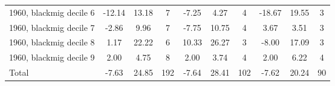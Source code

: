 \begin{table}[htbp]
\begin{tabular}{l*{3}{ccc}}
1960, blackmig decile 6&      -12.14&       13.18&           7&       -7.25&        4.27&           4&      -18.67&       19.55&           3\\
1960, blackmig decile 7&       -2.86&        9.96&           7&       -7.75&       10.75&           4&        3.67&        3.51&           3\\
1960, blackmig decile 8&        1.17&       22.22&           6&       10.33&       26.27&           3&       -8.00&       17.09&           3\\
1960, blackmig decile 9&        2.00&        4.75&           8&        2.00&        3.74&           4&        2.00&        6.22&           4\\
Total               &       -7.63&       24.85&         192&       -7.64&       28.41&         102&       -7.62&       20.24&          90\\
\bottomrule
\end{tabular}
\end{table}
